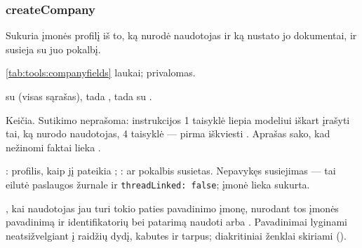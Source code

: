 \subsubsection{createCompany}\label{sec:tools:createCompany}
\begin{description}[style=multiline, leftmargin=19mm, labelwidth=17mm, labelsep=2mm,
  font=\sffamily\bfseries\footnotesize\color{ink}, itemsep=1pt, topsep=2pt, before=\raggedright]
  \item[Paskirtis] Sukuria įmonės profilį iš to, ką nurodė naudotojas ir ką nustato jo
    dokumentai, ir susieja su juo pokalbį.
  \item[Įvestis] \cref{tab:tools:companyfields} laukai;  privalomas.
  \item[Užklausos]  su  (visas sąrašas), tada
    , tada  su
    .
  \item[Pobūdis] Keičia. Sutikimo neprašoma: instrukcijos 1 taisyklė liepia modeliui iškart
    įrašyti tai, ką nurodo naudotojas, 4 taisyklė --- pirma iškviesti .
    Aprašas sako, kad nežinomi faktai lieka .
  \item[Grąžina] : profilis, kaip jį pateikia ;
    : ar pokalbis susietas. Nepavykęs susiejimas --- tai eilutė paslaugos
    žurnale ir \texttt{threadLinked: false}; įmonė lieka sukurta.
  \item[Klaidos] , kai naudotojas jau turi tokio paties pavadinimo
    įmonę, nurodant tos įmonės pavadinimą ir identifikatorių bei patarimą naudoti
     arba . Pavadinimai lyginami neatsižvelgiant į
    raidžių dydį, kabutes ir tarpus; diakritiniai ženklai skiriami ().
\end{description}

